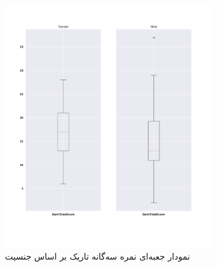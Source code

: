 \begin{figure}[htpb]
    \centering
    \includegraphics[width=0.8\textwidth]{./img/BoxPlotDarkTriadScoreSex.png}
    \caption{نمودار جعبه‌ای نمره سه‌گانه تاریک بر اساس جنسیت}
    \label{fig:BoxPlotDarkTriadScoreSex}
\end{figure}



